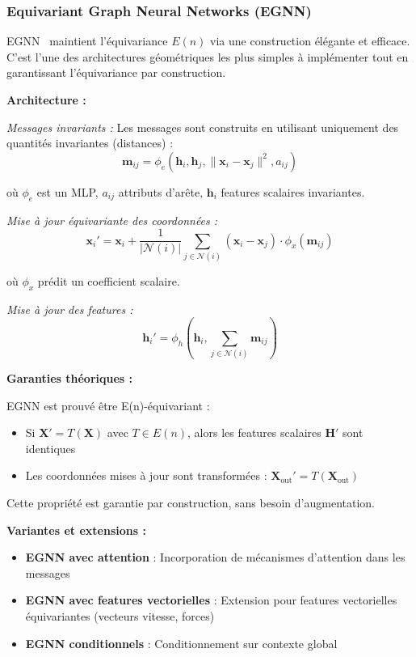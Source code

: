 \subsubsection{Equivariant Graph Neural Networks (EGNN)}

EGNN~\cite{Satorras2021} maintient l'équivariance $E(n)$ via une construction élégante et efficace. C'est l'une des architectures géométriques les plus simples à implémenter tout en garantissant l'équivariance par construction.

\textbf{Architecture :}

\textit{Messages invariants :}
Les messages sont construits en utilisant uniquement des quantités invariantes (distances) :
\[
\mathbf{m}_{ij} = \phi_e\left(\mathbf{h}_i, \mathbf{h}_j, \|\mathbf{x}_i - \mathbf{x}_j\|^2, a_{ij}\right)
\]

où $\phi_e$ est un MLP, $a_{ij}$ attributs d'arête, $\mathbf{h}_i$ features scalaires invariantes.

\textit{Mise à jour équivariante des coordonnées :}
\[
\mathbf{x}_i' = \mathbf{x}_i + \frac{1}{|\mathcal{N}(i)|}\sum_{j \in \mathcal{N}(i)} (\mathbf{x}_i - \mathbf{x}_j) \cdot \phi_x(\mathbf{m}_{ij})
\]

où $\phi_x$ prédit un coefficient scalaire.

\textit{Mise à jour des features :}
\[
\mathbf{h}_i' = \phi_h\left(\mathbf{h}_i, \sum_{j \in \mathcal{N}(i)} \mathbf{m}_{ij}\right)
\]

\textbf{Garanties théoriques :}

EGNN est prouvé être E(n)-équivariant :
\begin{itemize}
    \item Si $\mathbf{X}' = T(\mathbf{X})$ avec $T \in E(n)$, alors les features scalaires $\mathbf{H}'$ sont identiques
    \item Les coordonnées mises à jour sont transformées : $\mathbf{X}_{\text{out}}' = T(\mathbf{X}_{\text{out}})$
\end{itemize}

Cette propriété est garantie par construction, sans besoin d'augmentation.

\textbf{Variantes et extensions :}

\begin{itemize}
    \item \textbf{EGNN avec attention} : Incorporation de mécanismes d'attention dans les messages
    \item \textbf{EGNN avec features vectorielles} : Extension pour features vectorielles équivariantes (vecteurs vitesse, forces)
    \item \textbf{EGNN conditionnels} : Conditionnement sur contexte global
\end{itemize}

